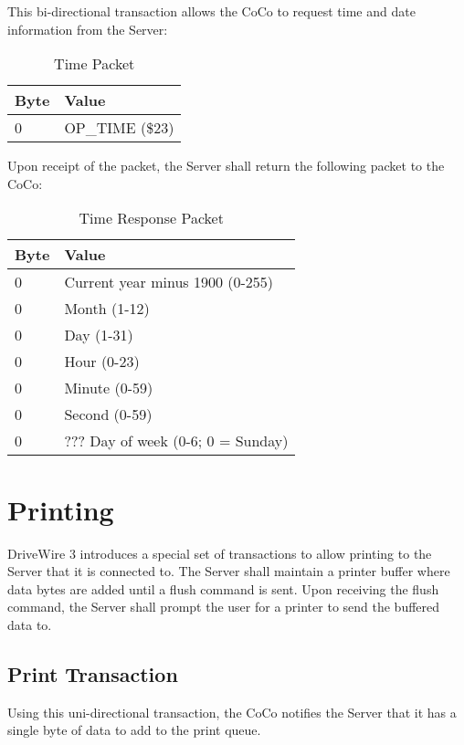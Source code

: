 \documentclass{article}
\begin{document}
This bi-directional transaction allows the CoCo to request time and date information from the Server:

\begin{table}[ht]
\caption{Time Packet}
\begin{center}
\begin{tabular}{|ll|}
\hline
Byte & Value \\ \hline
0 & OP\_TIME (\$23) \\
\hline
\end{tabular}
\end{center}
\end{table}

Upon receipt of the packet, the Server shall return the following packet to the CoCo:

\begin{table}[ht]
\caption{Time Response Packet}
\begin{center}
\begin{tabular}{|ll|}
\hline
Byte & Value \\ \hline
0 & Current year minus 1900 (0-255) \\
0 & Month (1-12) \\
0 & Day (1-31) \\
0 & Hour (0-23) \\
0 & Minute (0-59) \\
0 & Second (0-59) \\
0 & ??? Day of week (0-6; 0 = Sunday) \\
\hline
\end{tabular}
\end{center}
\end{table}

\section{Printing}

DriveWire 3 introduces a special set of transactions to allow printing to the Server that it is connected to. The Server shall maintain a printer buffer where data bytes are added until a flush command is sent.	Upon receiving the flush command, the Server shall prompt the user for a printer to send the buffered data to.

\subsection{Print Transaction}
Using this uni-directional transaction, the CoCo notifies the Server that it has a single byte of data to add to the print queue.
\end{document}

